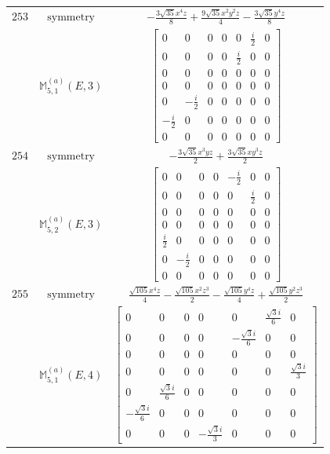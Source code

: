 \documentclass[fleqn,8pt,landscape]{jsarticle}
\begin{document}
\begin{longtable}{ccc}
$ 253 $ & $ \text{symmetry} $ & $ - \frac{3 \sqrt{35} x^{4} z}{8} + \frac{9 \sqrt{35} x^{2} y^{2} z}{4} - \frac{3 \sqrt{35} y^{4} z}{8} $ \\
$  $ & $ \mathbb{M}_{5,1}^{(a)}(E,3) $ & $ \begin{bmatrix} 0 & 0 & 0 & 0 & 0 & \frac{i}{2} & 0 \\ 0 & 0 & 0 & 0 & \frac{i}{2} & 0 & 0 \\ 0 & 0 & 0 & 0 & 0 & 0 & 0 \\ 0 & 0 & 0 & 0 & 0 & 0 & 0 \\ 0 & - \frac{i}{2} & 0 & 0 & 0 & 0 & 0 \\ - \frac{i}{2} & 0 & 0 & 0 & 0 & 0 & 0 \\ 0 & 0 & 0 & 0 & 0 & 0 & 0 \end{bmatrix} $ \\ \hline
$ 254 $ & $ \text{symmetry} $ & $ - \frac{3 \sqrt{35} x^{3} y z}{2} + \frac{3 \sqrt{35} x y^{3} z}{2} $ \\
$  $ & $ \mathbb{M}_{5,2}^{(a)}(E,3) $ & $ \begin{bmatrix} 0 & 0 & 0 & 0 & - \frac{i}{2} & 0 & 0 \\ 0 & 0 & 0 & 0 & 0 & \frac{i}{2} & 0 \\ 0 & 0 & 0 & 0 & 0 & 0 & 0 \\ 0 & 0 & 0 & 0 & 0 & 0 & 0 \\ \frac{i}{2} & 0 & 0 & 0 & 0 & 0 & 0 \\ 0 & - \frac{i}{2} & 0 & 0 & 0 & 0 & 0 \\ 0 & 0 & 0 & 0 & 0 & 0 & 0 \end{bmatrix} $ \\ \hline
$ 255 $ & $ \text{symmetry} $ & $ \frac{\sqrt{105} x^{4} z}{4} - \frac{\sqrt{105} x^{2} z^{3}}{2} - \frac{\sqrt{105} y^{4} z}{4} + \frac{\sqrt{105} y^{2} z^{3}}{2} $ \\
$  $ & $ \mathbb{M}_{5,1}^{(a)}(E,4) $ & $ \begin{bmatrix} 0 & 0 & 0 & 0 & 0 & \frac{\sqrt{3} i}{6} & 0 \\ 0 & 0 & 0 & 0 & - \frac{\sqrt{3} i}{6} & 0 & 0 \\ 0 & 0 & 0 & 0 & 0 & 0 & 0 \\ 0 & 0 & 0 & 0 & 0 & 0 & \frac{\sqrt{3} i}{3} \\ 0 & \frac{\sqrt{3} i}{6} & 0 & 0 & 0 & 0 & 0 \\ - \frac{\sqrt{3} i}{6} & 0 & 0 & 0 & 0 & 0 & 0 \\ 0 & 0 & 0 & - \frac{\sqrt{3} i}{3} & 0 & 0 & 0 \end{bmatrix} $ \\ \hline

\end{longtable}
\end{document}
